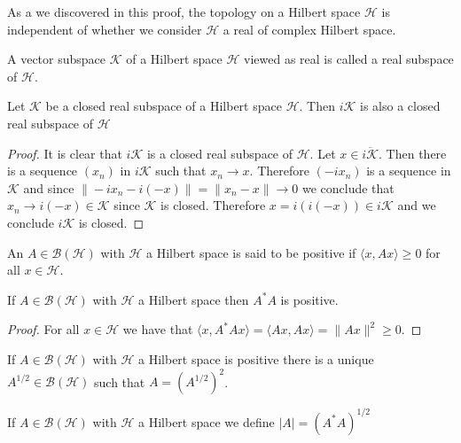 As a we discovered in this proof, the topology on a Hilbert space $\mathcal{H}$ is independent of whether we consider $\mathcal{H}$ a real of complex Hilbert space.

\begin{definition}
A vector subspace $\mathcal{K}$ of a Hilbert space $\mathcal{H}$ viewed as real is called a real subspace of $\mathcal{H}$.
\end{definition}

\begin{theorem}
Let $\mathcal{K}$ be a closed real subspace of a Hilbert space $\mathcal{H}$. Then $i\mathcal{K}$ is also a closed real subspace of $\mathcal{H}$
\end{theorem} 

\begin{proof}
It is clear that $i\mathcal{K}$ is a closed real subspace of $\mathcal{H}$. Let $x\in\overline{i\mathcal{K}}$. Then there is a sequence $(x_n)$ in $i\mathcal{K}$ such that $x_n\rightarrow x$. Therefore $(-ix_n)$ is a sequence in $\mathcal{K}$ and since $\|-ix_n-i(-x)\|=\|x_n-x\|\rightarrow 0$ we conclude that $x_n\rightarrow i(-x)\in\mathcal{K}$ since $\mathcal{K}$ is closed. Therefore $x=i(i(-x))\in i\mathcal{K}$ and we conclude $i\mathcal{K}$ is closed.  
\end{proof}

\begin{definition}
An $A\in\mathcal{B}(\mathcal{H})$ with $\mathcal{H}$ a Hilbert space is said to be positive if $\langle x,Ax\rangle\geq 0$ for all $x\in\mathcal{H}$.
\end{definition}

\begin{theorem}
If $A\in\mathcal{B}(\mathcal{H})$ with $\mathcal{H}$ a Hilbert space then $A^*A$ is positive. 
\end{theorem}

\begin{proof}
For all $x\in\mathcal{H}$ we have that $\langle x,A^*Ax\rangle=\langle Ax,Ax \rangle = \|Ax\|^2\geq 0$.
\end{proof}

\begin{theorem}
If $A\in\mathcal{B}(\mathcal{H})$ with $\mathcal{H}$ a Hilbert space is positive there is a unique $A^{1/2}\in\mathcal{B}(\mathcal{H})$ such that $A=(A^{1/2})^2$.
\end{theorem}

\begin{definition}
If $A\in\mathcal{B}(\mathcal{H})$ with $\mathcal{H}$ a Hilbert space we define $|A|=(A^*A)^{1/2}$
\end{definition}

